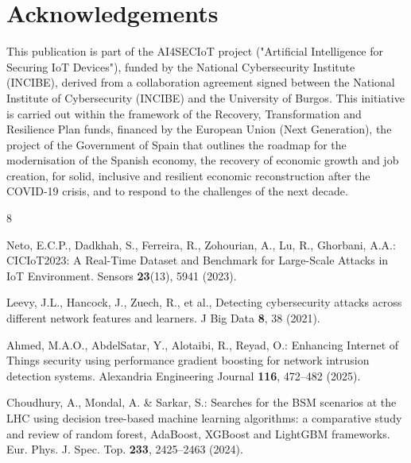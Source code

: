 \documentclass[runningheads]{llncs}
\begin{document}
\section*{Acknowledgements}
This publication is part of the AI4SECIoT project ("Artificial Intelligence for Securing IoT Devices"), funded by the National Cybersecurity Institute (INCIBE), derived from a collaboration agreement signed between the National Institute of Cybersecurity (INCIBE) and the University of Burgos. This initiative is carried out within the framework of the Recovery, Transformation and Resilience Plan funds, financed by the European Union (Next Generation), the project of the Government of Spain that outlines the roadmap for the modernisation of the Spanish economy, the recovery of economic growth and job creation, for solid, inclusive and resilient economic reconstruction after the COVID‑19 crisis, and to respond to the challenges of the next decade.
\begin{thebibliography}{8}

Neto, E.C.P., Dadkhah, S., Ferreira, R., Zohourian, A., Lu, R., Ghorbani, A.A.: CICIoT2023: A Real-Time Dataset and Benchmark for Large-Scale Attacks in IoT Environment. Sensors \textbf{23}(13), 5941 (2023). 

Leevy, J.L., Hancock, J., Zuech, R., et al., Detecting cybersecurity attacks across different network features and learners. J Big Data \textbf{8}, 38 (2021). 

Ahmed, M.A.O., AbdelSatar, Y., Alotaibi, R., Reyad, O.: Enhancing Internet of Things security using performance gradient boosting for network intrusion detection systems. Alexandria Engineering Journal \textbf{116}, 472--482 (2025). 

Choudhury, A., Mondal, A. \& Sarkar, S.: Searches for the BSM scenarios at the LHC using decision tree-based machine learning algorithms: a comparative study and review of random forest, AdaBoost, XGBoost and LightGBM frameworks. Eur. Phys. J. Spec. Top. \textbf{233}, 2425–2463 (2024). 

\end{thebibliography}
\end{document}

